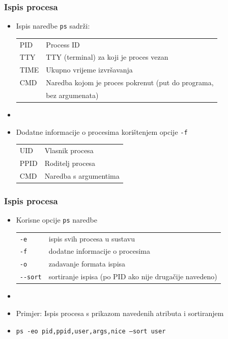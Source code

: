 \documentclass[table,usenames,dvipsnames]{beamer}
\newcommand{\shell}[1]{\texttt{#1}}
\begin{document}
\begin{frame}[t]
	\frametitle{Ispis procesa}
	\begin{itemize}
		\item Ispis naredbe \shell{ps} sadrži:
		\begin{tabular}{l l}
			PID   & Process ID \\
			TTY   & TTY (terminal) za koji je proces vezan \\
			TIME  & Ukupno vrijeme izvršavanja  \\
			CMD   & Naredba kojom je proces pokrenut (put do programa, \\ & bez argumenata)
		\end{tabular}
		\item[]
		\item Dodatne informacije o procesima korištenjem opcije \shell{-f}
		\begin{tabular}{l l}
			UID   & Vlasnik procesa \\
			PPID  &   Roditelj procesa \\
			CMD   &   Naredba s argumentima
		\end{tabular}
	\end{itemize}
\end{frame}

\begin{frame}[t]
	\frametitle{Ispis procesa}
	\begin{itemize}
		\item Korisne opcije \shell{ps} naredbe
		\begin{tabular}{l l}
			\shell{-e}        & ispis svih procesa u sustavu \\
			\shell{-f}        & dodatne informacije o procesima \\
			\shell{-o}        & zadavanje formata ispisa \\
			\shell{-{}-sort}  & sortiranje ispisa (po PID ako nije drugačije navedeno)
		\end{tabular} 
		\item[]
		\item[] Primjer: Ispis procesa s prikazom navedenih atributa i sortiranjem
		\item[] \hspace{40pt} \shell{ps -eo pid,ppid,user,args,nice --sort user}
	\end{itemize}
\end{frame}
\end{document}
